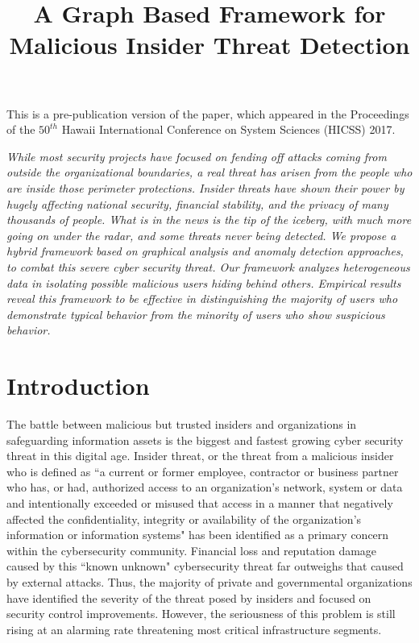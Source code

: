 \documentclass[conference,draftclsnofoot,onecolumn]{IEEEtran}%
\makeatletter
\renewenvironment{abstract}{%
\titlepage
\null\vfil
\@beginparpenalty\@lowpenalty
\begin{center}%
\bfseries \abstractname
 \@endparpenalty\@M
 \end{center}%
 \par}%
 {\par\vfil\null\endtitlepage}
\renewenvironment{abstract}{%
 \begin{center}%
	\rmfamily\bfseries\fontsize{12}{14} \abstractname
 \end{center}%
 \par
 \itshape}%
\makeatother
\begin{document}
\title{A Graph Based Framework for Malicious Insider Threat Detection}
\author{
}

\maketitle

This is a pre-publication version of the paper, which appeared in the Proceedings of the $50^{th}$ Hawaii International Conference on System Sciences (HICSS) 2017.

\begin{abstract}
While most security projects have focused on fending off attacks coming from outside the organizational boundaries, a real threat has arisen from the people who are inside those perimeter protections.
Insider threats have shown their power by hugely affecting national security, financial stability, and the privacy of many thousands of people. What is in the news is the tip of the iceberg, with much more going on under the radar, and some threats never being detected. We propose a hybrid framework based on graphical analysis and anomaly detection approaches, to combat this severe cyber security threat. Our framework analyzes heterogeneous data in isolating possible malicious users hiding behind others. Empirical results reveal this framework to be effective in distinguishing the majority of users who demonstrate typical behavior from the minority of users who show suspicious behavior.
\end{abstract}

\section{Introduction}
The battle between malicious but trusted insiders and organizations in safeguarding information assets is the biggest and fastest growing cyber security threat in this digital age. Insider threat, or the threat from a malicious insider who is defined as ``a current or former employee, contractor or business partner who has, or had, authorized access to an organization's network, system or data and intentionally exceeded or misused that access in a manner that negatively affected the confidentiality, integrity or availability of the organization's information or information systems" \cite{CommonSenseGuide3} has been identified as a primary concern within the cybersecurity community. Financial loss and reputation damage caused by this ``known unknown" cybersecurity threat far outweighs that caused by external attacks. Thus, the majority of private and governmental organizations have identified the severity of the threat posed by insiders and focused on security control improvements. However, the seriousness of this problem is still rising at an alarming rate threatening most critical infrastructure segments.  
\end{document}
